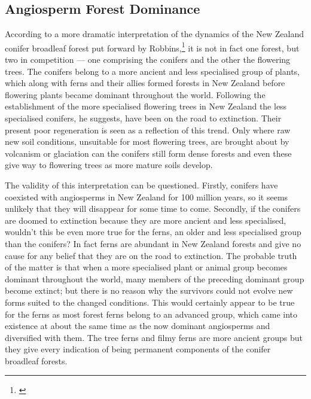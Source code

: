 \subsection{Angiosperm Forest Dominance}

According to a more dramatic interpretation of the dynamics of the New Zealand conifer broadleaf forest put forward by Robbins,\footnote{\cite{robbins1962podocarp}} it is not in fact one forest, but two in competition --- one comprising the conifers and the other the flowering trees.
The conifers belong to a more ancient and less specialised group of plants, which along with ferns and their allies formed forests in New Zealand before flowering plants became dominant throughout the world.
Following the establishment of the more specialised flowering trees in New Zealand the less specialised conifers, he suggests, have been on the road to extinction.
Their present poor regeneration is seen as a reflection of this trend.
Only where raw new soil conditions, unsuitable for most flowering trees, are brought about by volcanism or glaciation can the conifers still form dense forests and even these give way to flowering trees as more mature soils develop.

The validity of this interpretation can be questioned.
Firstly, conifers have coexisted with angiosperms in New Zealand for 100 million years, so it seems unlikely that they will disappear for some time to come.
Secondly, if the conifers are doomed to extinction because they are more ancient and less specialised, wouldn't this be even more true for the ferns, an older and less specialised group than the conifers? In fact ferns are abundant in New Zealand forests and give no cause for any belief that they are on the road to extinction.
The probable truth of the matter is that when a more specialised plant or animal group becomes dominant throughout the world, many members of the preceding dominant group become extinct; but there is no reason why the survivors could not evolve new forms suited to the changed conditions.
This would certainly appear to be true for the ferns as most forest ferns belong to an advanced group, which came into existence at about the same time as the now dominant angiosperms and diversified with them.
The tree ferns and filmy ferns are more ancient groups but they give every indication of being permanent components of the conifer broadleaf forests.

